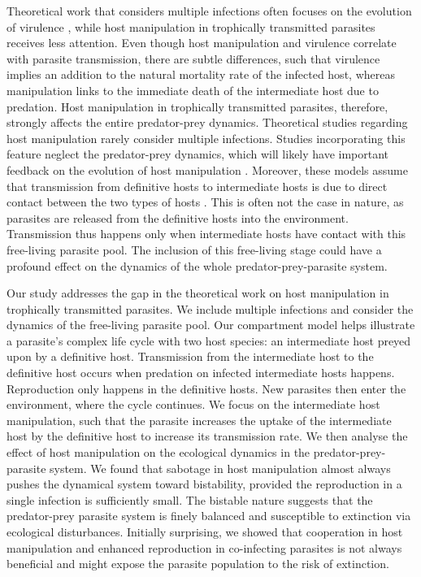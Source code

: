 \documentclass[a4paper]{scrartcl}
\begin{document}
Theoretical work that considers multiple infections often focuses on the evolution of virulence \citep{vanBaalen1995, Alizon2013, Alizon2008, Choisy2010, Alizon2012}, while host manipulation in trophically transmitted parasites receives less attention. 
Even though host manipulation and virulence correlate with parasite transmission, there are subtle differences, such that virulence implies an addition to the natural mortality rate of the infected host, whereas manipulation links to the immediate death of the intermediate host due to predation. 
Host manipulation in trophically transmitted parasites, therefore, strongly affects the entire predator-prey dynamics. 
Theoretical studies regarding host manipulation rarely consider multiple infections. 
Studies incorporating this feature neglect the predator-prey dynamics, which will likely have important feedback on the evolution of host manipulation \citep{Parker2003,Vickery2009}.
Moreover, these models assume that transmission from definitive hosts to intermediate hosts is due to direct contact between the two types of hosts \citep{Rogawa2018, Hadeler1989, Fenton2006}. 
This is often not the case in nature, as parasites are released from the definitive hosts into the environment. 
Transmission thus happens only when intermediate hosts have contact with this free-living parasite pool. The inclusion of this free-living stage could have a profound effect on the dynamics of the whole predator-prey-parasite system.


Our study addresses the gap in the theoretical work on host manipulation in trophically transmitted parasites.
We include multiple infections and consider the dynamics of the free-living parasite pool. 
Our compartment model helps illustrate a parasite's complex life cycle with two host species: an intermediate host preyed upon by a definitive host. 
Transmission from the intermediate host to the definitive host occurs when predation on infected intermediate hosts happens. 
Reproduction only happens in the definitive hosts. 
New parasites then enter the environment, where the cycle continues. 
We focus on the intermediate host manipulation, such that the parasite increases the uptake of the intermediate host by the definitive host to increase its transmission rate. 
We then analyse the effect of host manipulation on the ecological dynamics in the predator-prey-parasite system. 
We found that sabotage in host manipulation almost always pushes the dynamical system toward bistability, provided the reproduction in a single infection is sufficiently small. 
The bistable nature suggests that the predator-prey parasite system is finely balanced and susceptible to extinction via ecological disturbances. 
Initially surprising, we showed that cooperation in host manipulation and enhanced reproduction in co-infecting parasites is not always beneficial and might expose the parasite population to the risk of extinction.
\end{document}
